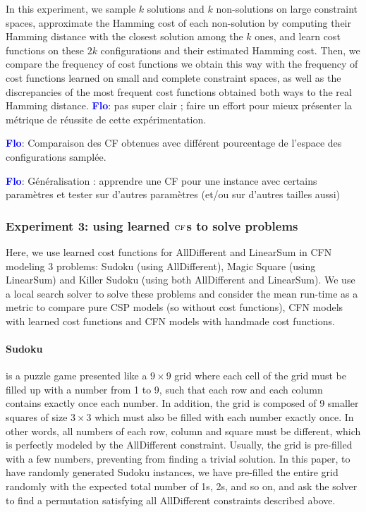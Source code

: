 \documentclass{article}
\newcommand{\csp}{\textsc{CSP}\xspace}
\newcommand{\cfn}{\textsc{CFN}\xspace}
\newcommand{\cf}{\textsc{cf}\xspace}
\newcommand{\flo}{\textcolor{blue}{\bf Flo}\xspace}
\begin{document}
In this experiment,  we sample $k$ solutions and  $k$ non-solutions on
large  constraint  spaces,  approximate   the  Hamming  cost  of  each
non-solution  by computing  their  Hamming distance  with the  closest
solution among  the $k$ ones, and  learn cost functions on  these $2k$
configurations and their estimated Hamming  cost. Then, we compare the
frequency of cost  functions we obtain this way with  the frequency of
cost functions  learned on  small and  complete constraint  spaces, as
well as the discrepancies of the most frequent cost functions obtained
both ways to the real Hamming  distance. \flo: pas super clair ; faire
un  effort pour  mieux  présenter  la métrique  de  réussite de  cette
expérimentation. 

\flo:  Comparaison  des  CF  obtenues avec  différent  pourcentage  de
l'espace des configurations samplée.

\flo: Généralisation  : apprendre  une CF  pour une  instance avec  certains
paramètres  et  tester sur  d'autres  paramètres  (et/ou sur  d'autres
tailles aussi)

\subsubsection{Experiment 3: using learned $\cf$s to solve problems}

Here, we use learned cost  functions for AllDifferent and LinearSum in
\cfn modeling  3 problems:  Sudoku (using AllDifferent),  Magic Square
(using  LinearSum)  and Killer  Sudoku  (using  both AllDifferent  and
LinearSum). We use  a local search solver to solve  these problems and
consider the mean run-time as a metric to compare pure \csp models (so
without cost functions),  \cfn models with learned  cost functions and
\cfn models with handmade cost functions.

\paragraph{Sudoku} is a puzzle game presented like a $9 \times 9$ grid
where each cell of the grid must be  filled up with a number from 1 to
9,  such that  each row  and each  column contains  exactly once  each
number. In addition, the grid is composed of 9 smaller squares of size
$3  \times 3$  which  must also  be filled  with  each number  exactly
once. In other words, all numbers  of each row, column and square must
be  different,   which  is  perfectly  modeled   by  the  AllDifferent
constraint.   Usually, the  grid  is pre-filled  with  a few  numbers,
preventing from  finding a trivial  solution.  In this paper,  to have
randomly  generated Sudoku  instances, we  have pre-filled  the entire
grid randomly with the expected total number of 1s, 2s, and so on, and
ask  the solver  to  find a  permutation  satisfying all  AllDifferent
constraints described above.
\end{document}
